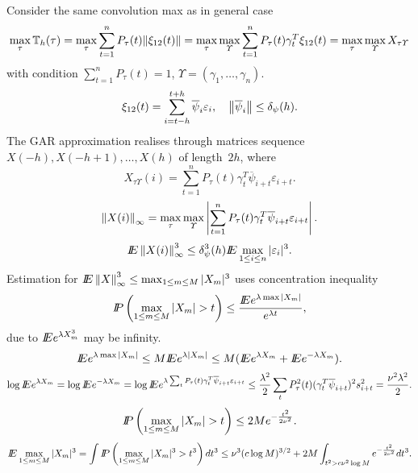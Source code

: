 Consider the same convolution max as in general case 
\[
\max_{\tau} \dLhconv = \max_{\tau} \sum_{t = 1}^{n} P_{\tau}(t)  \Vert  \dxi (t) \Vert = \max_{\tau} \max_{\Upsilon} \sum_{t = 1}^{n} P_{\tau}(t)  \gamma_t^{T}   \dxi (t)  = \max_{\tau} \max_{\Upsilon} X_{\tau \Upsilon}
\]
with condition $\sum_{t =1}^{n} P_{\tau}(t) = 1$, $\Upsilon = (\gamma_1,\ldots,\gamma_n)$.
\[
\dxi (t)   = \sum_{i = t-h}^{t + h} \overline{\psi}_i \varepsilon_{i}, 
\quad 
\normp{ \overline{\psi}_i } \leq \delta_{\psi}(h).	
\]
The GAR approximation realises through matrices sequence $ X (-h), X (-h + 1),\ldots, X (h)$ of length~$2h$, where
\[
X_{\tau \Upsilon}(i) = \sum_{t = 1}^{n} P_{\tau}(t)  \gamma_t^{T}  \overline{\psi}_{i + t} \varepsilon_{i + t}. 
\]
\[
\normp{X(i)}_{\infty} =  \max_{\tau} \max_{\Upsilon} \left |  \sum_{t = 1}^{n} P_{\tau}(t)  \gamma_t^{T}  \overline{\psi}_{i + t} \varepsilon_{i + t} \right  |.
\]
\[
\E \normp{X(i)}^{3}_{\infty} \leq \delta_{\psi}^3(h) \E \max_{1 \leq i \leq n} | \varepsilon_i |^3. 
\]
Estimation for $\E \normp{X}^3_{\infty} \leq \max_{1 \leq m \leq M} |X_m|^3  $ uses concentration inequality 
\[
\P \left(\max_{1 \leq m \leq M} |X_m| > t  \right) \leq  \frac{\E e^{\lambda \max |X_m|}}{e^{\lambda t}},
\] 
due to $\E e^{\lambda X_m^3}$ may be infinity.
\[
\E e^{\lambda \max |X_m|} \leq M \E e^{\lambda |X_m|} \leq M (\E e^{\lambda X_m} + \E e^{-\lambda X_m} ).
\]
\[
\log \E e^{\lambda X_m} = \log \E e^{ - \lambda X_m}    = \log \E e^{ \lambda \sum_t P_{\tau}(t)  \gamma_t^{T}  \overline{\psi}_{i + t} \varepsilon_{i + t}}  \leq
\frac{\lambda^2}{2} \sum_t P_{\tau}^2(t)  (\gamma_t^{T}  \overline{\psi}_{i + t} )^2 s^2_{i+t} = \frac{\nu^2 \lambda^2}{2}.
\]
\[
\P \left(\max_{1 \leq m \leq M} |X_m| > t  \right) \leq 2 M e^{ - \frac{ t^2}{2 \nu^2}  }.
\] 
\[ 
\E \max_{1 \leq m \leq M} |X_m|^3  = \int \P \left(\max_{1 \leq m \leq M} |X_m|^3 > t^3  \right) dt^3 \leq \nu^3 (c \log M)^{3/2} + 2 M \int_{t^2 > c \nu^2 \log M} e^{ - \frac{ t^2}{2 \nu^2}  } dt^3.
\]

